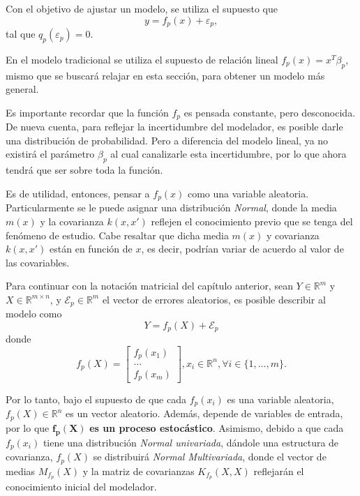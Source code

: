 Con el objetivo de ajustar un modelo, se utiliza el supuesto que
\begin{equation*}
    y = f_p(x) + \varepsilon_p,
\end{equation*}
tal que $q_p(\varepsilon_p)=0$. 

En el modelo tradicional se utiliza el supuesto de relaci\'on lineal $f_p(x) = x^T\beta_p$, mismo que se buscar\'a relajar en esta secci\'on, para obtener un modelo m\'as general.

Es importante recordar que la función $f_p$ es pensada constante, pero desconocida. De nueva cuenta, para reflejar la incertidumbre del modelador, es posible darle una distribución de probabilidad. Pero a diferencia del modelo lineal, ya no existir\'a el parámetro $\beta_p$ al cual canalizarle esta incertidumbre, por lo que ahora tendrá que ser sobre toda la función. 

Es de utilidad, entonces, pensar a $f_p(x)$ como una variable aleatoria. Particularmente se le puede asignar una distribución \textit{Normal}, donde la media $m(x)$ y la covarianza $k(x,x')$ reflejen el conocimiento previo que se tenga del fenómeno de estudio. Cabe resaltar que dicha media $m(x)$ y covarianza $k(x,x')$ están en función de $x$, es decir, podrían variar de acuerdo al valor de las covariables. 

Para continuar con la notación matricial del cap\'itulo anterior, sean $Y \in \mathbb{R}^m$ y $X \in \mathbb{R}^{m \times n}$, y $\mathcal{E}_p \in \mathbb{R}^m$ el vector de errores aleatorios, es posible describir al modelo como
\begin{equation*}
    Y = f_p(X) + \mathcal{E}_p
\end{equation*}
donde
\begin{equation*}
    f_p(X) =     
    \left[
        \begin{array}{c}
        f_p(x_1)  \\
        ... \\
        f_p(x_m)
        \end{array}
    \right], 
    x_i \in \mathbb{R}^n, \forall i \in \{1,...,m\}.
\end{equation*}

Por lo tanto, bajo el supuesto de que cada $f_p(x_i)$ es una variable aleatoria, $f_p(X) \in \mathbb{R}^n$ es un vector aleatorio. Adem\'as, depende de variables de entrada, por lo que $\bm{f_p(X)}$ \textbf{es un proceso estoc\'astico}. Asimismo, debido a que cada $f_p(x_i)$ tiene una distribuci\'on \textit{Normal univariada}, d\'andole una estructura de covarianza, $f_p(X)$ se distribuir\'a \textit{Normal Multivariada}, donde el vector de medias $M_{f_p}(X)$ y la matriz de covarianzas $K_{f_p}(X,X)$ reflejar\'an el conocimiento inicial del modelador.

